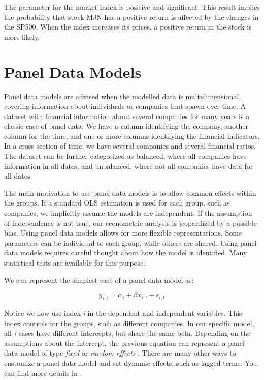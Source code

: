 \documentclass[11pt,]{book}
\begin{document}
The parameter for the market index is positive and significant. This
result implies the probability that stock MJN has a positive return is
affected by the changes in the SP500. When the index increases its
prices, a positive return in the stock is more likely.

\section{Panel Data Models}\label{panel-data-models}

Panel data models are advised when the modelled data is
multidimensional, covering information about individuals or companies
that spawn over time. A dataset with financial information about several
companies for many years is a classic case of panel data. We have a
column identifying the company, another column for the time, and one or
more columns identifying the financial indicators. In a cross section of
time, we have several companies and several financial ratios. The
dataset can be further categorized as balanced, where all companies have
information in all dates, and unbalanced, where not all companies have
data for all dates.

The main motivation to use panel data models is to allow common effects
within the groups. If a standard OLS estimation is used for each group,
such as companies, we implicitly assume the models are independent. If
the assumption of independence is not true, our econometric analysis is
jeopardized by a possible bias. Using panel data models allows for more
flexible representations. Some parameters can be individual to each
group, while others are shared. Using panel data models requires careful
thought about how the model is identified. Many statistical tests are
available for this purpose.

We can represent the simplest case of a panel data model as:

\[ y_{i,t} = \alpha _i + \beta x_{i,t}+\epsilon _{i,t} \]

Notice we now use index \emph{i} in the dependent and independent
variables. This index controls for the groups, such as different
companies. In our specific model, all \emph{i} cases have different
intercepts, but share the same beta. Depending on the assumptions about
the intercept, the previous equation can represent a panel data model of
type \emph{fixed} or \emph{random effects} . There are many other ways
to customize a panel data model and set dynamic effects, such as lagged
terms. You can find more details in \citet{hsiao2014analysis}.
\end{document}
